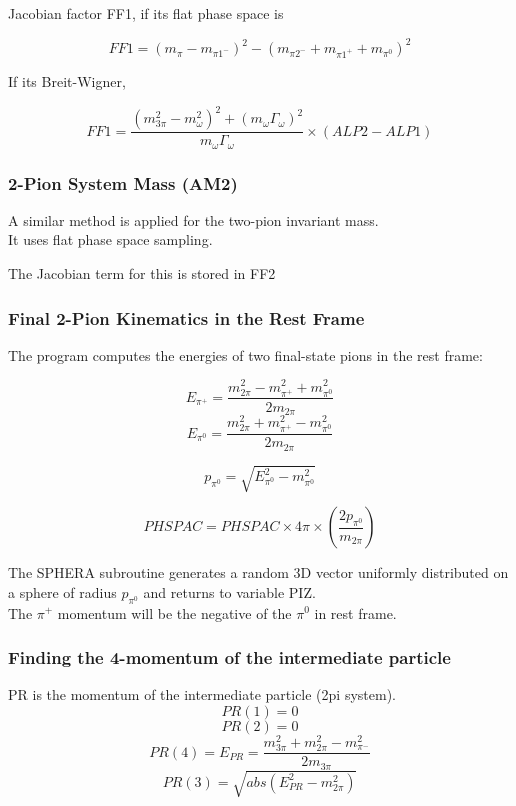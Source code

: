 \documentclass[12pt]{article}
\begin{document}
Jacobian factor FF1, if its flat phase space is

\[FF1 = (m_\pi - m_{\pi1^-})^2 - ( m_{\pi2^-} + m_{\pi1^+} + m_{\pi^0})^2\]

If its Breit-Wigner, 

\[FF1 = \frac{(m_{3\pi}^2 -m_\omega^2)^2 + (m_\omega \Gamma_\omega)^2}{m_\omega \Gamma_\omega} \times (ALP2-ALP1)\]

\subsubsection{2-Pion System Mass (AM2)}

A similar method is applied for the two-pion invariant mass.\\
It uses flat phase space sampling.

The Jacobian term for this is stored in FF2

\subsubsection{Final 2-Pion Kinematics in the Rest Frame}
The program computes the energies of two final-state pions in the rest frame:

\[E_{\pi^+} = \frac{m_{2\pi}^2- m_{\pi^+}^2+m_{\pi^0}^2}{2m_{2\pi}}\]
\[E_{\pi^0} = \frac{m_{2\pi}^2+ m_{\pi^+}^2-m_{\pi^0}^2}{2m_{2\pi}}\]

\[p_{\pi^0} = \sqrt{E_{\pi^0}^2 - m_{\pi^0}^2}\]

\[PHSPAC = PHSPAC \times 4\pi \times (\frac{2 p_{\pi^0}}{m_{2\pi}}) \]

The SPHERA subroutine generates a random 3D vector uniformly distributed on a sphere of radius $p_{\pi^0}$ and returns to variable PIZ.\\

The $\pi^+$ momentum will be the negative of the $\pi^0$ in rest frame.\\



\subsubsection{Finding the 4-momentum of the intermediate particle}

PR is the momentum of the intermediate particle (2pi system). \\

\[PR(1) = 0\]
\[PR(2) = 0\]
\[PR(4) = E_{PR} = \frac{m_{3\pi}^2+m_{2\pi}^2- m_{\pi^-}^2}{2m_{3\pi}}\]
\[PR(3) = \sqrt{abs(E_{PR}^2-m_{2\pi}^2)} \]
\end{document}
